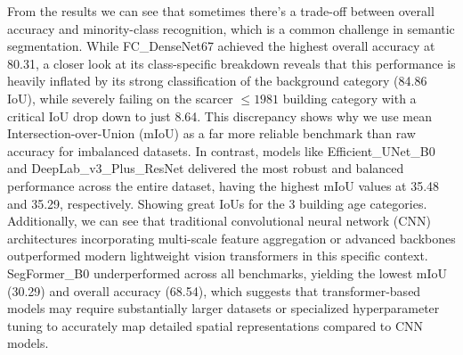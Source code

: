 \documentclass{article}
\begin{document}
From the results we can see that sometimes there's a trade-off between overall accuracy and minority-class recognition, which is a common challenge in semantic segmentation. While FC\_DenseNet67 achieved the highest overall accuracy at 80.31, a closer look at its class-specific breakdown reveals that this performance is heavily inflated by its strong classification of the background category (84.86 IoU), while severely failing on the scarcer $\le 1981$ building category with a critical IoU drop down to just 8.64. This discrepancy shows why we use mean Intersection-over-Union (mIoU) as a far more reliable benchmark than raw accuracy for imbalanced datasets. In contrast, models like Efficient\_UNet\_B0 and DeepLab\_v3\_Plus\_ResNet delivered the most robust and balanced performance across the entire dataset, having the highest mIoU values at 35.48 and 35.29, respectively. Showing great IoUs for the 3 building age categories.\\

\noindent
Additionally, we can see that traditional convolutional neural network (CNN) architectures incorporating multi-scale feature aggregation or advanced backbones outperformed modern lightweight vision transformers in this specific context. SegFormer\_B0 underperformed across all benchmarks, yielding the lowest mIoU (30.29) and overall accuracy (68.54), which suggests that transformer-based models may require substantially larger datasets or specialized hyperparameter tuning to accurately map detailed spatial representations compared to CNN models.
\end{document}
